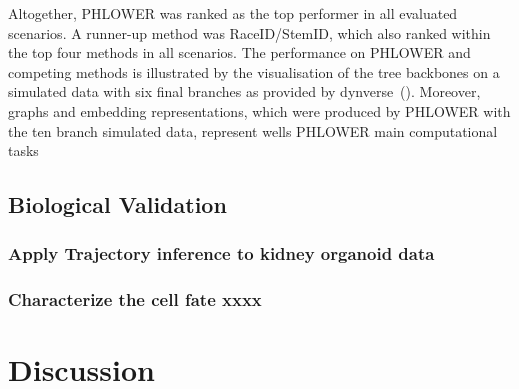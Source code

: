 Altogether, PHLOWER was ranked as the top performer in all evaluated scenarios. A runner-up method was RaceID/StemID, which also ranked within the top four methods in all scenarios. The performance on PHLOWER and competing methods is illustrated by the visualisation of the tree backbones on a simulated data with six final branches as provided by dynverse~(). Moreover, graphs and embedding representations, which were produced by PHLOWER with the ten branch simulated data, represent wells PHLOWER main computational tasks

\subsection{Biological Validation}
\subsubsection{Apply Trajectory inference to kidney organoid data}
\subsubsection{Characterize the cell fate xxxx}
\section{Discussion}

